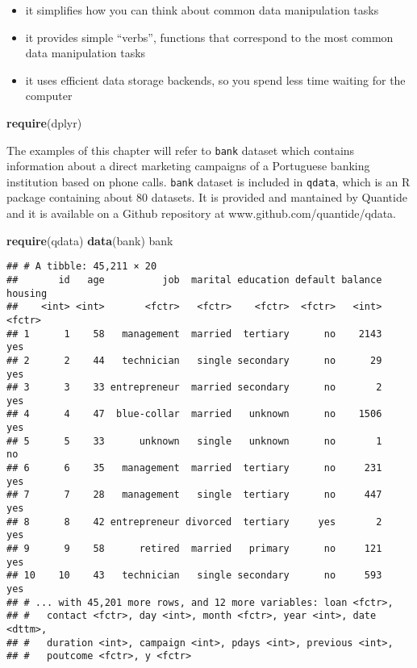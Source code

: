 \documentclass[]{book}
\newenvironment{Shaded}{\begin{snugshade}}{\end{snugshade}}
\newcommand{\KeywordTok}[1]{\textcolor[rgb]{0.13,0.29,0.53}{\textbf{{#1}}}}
\newcommand{\NormalTok}[1]{{#1}}
\providecommand{\tightlist}{%
  \setlength{\itemsep}{0pt}\setlength{\parskip}{0pt}}
\def\tightlist{}
\begin{document}
\begin{itemize}
\tightlist
\item
  it simplifies how you can think about common data manipulation tasks
\item
  it provides simple ``verbs'', functions that correspond to the most
  common data manipulation tasks
\item
  it uses efficient data storage backends, so you spend less time
  waiting for the computer
\end{itemize}

\begin{Shaded}
\begin{Highlighting}[]
\KeywordTok{require}\NormalTok{(dplyr)}
\end{Highlighting}
\end{Shaded}

The examples of this chapter will refer to \texttt{bank} dataset which
contains information about a direct marketing campaigns of a Portuguese
banking institution based on phone calls. \texttt{bank} dataset is
included in \texttt{qdata}, which is an R package containing about 80
datasets. It is provided and mantained by Quantide and it is available
on a Github repository at www.github.com/quantide/qdata.

\begin{Shaded}
\begin{Highlighting}[]
\KeywordTok{require}\NormalTok{(qdata)}
\KeywordTok{data}\NormalTok{(bank) }
\NormalTok{bank}
\end{Highlighting}
\end{Shaded}

\begin{verbatim}
## # A tibble: 45,211 × 20
##       id   age          job  marital education default balance housing
##    <int> <int>       <fctr>   <fctr>    <fctr>  <fctr>   <int>  <fctr>
## 1      1    58   management  married  tertiary      no    2143     yes
## 2      2    44   technician   single secondary      no      29     yes
## 3      3    33 entrepreneur  married secondary      no       2     yes
## 4      4    47  blue-collar  married   unknown      no    1506     yes
## 5      5    33      unknown   single   unknown      no       1      no
## 6      6    35   management  married  tertiary      no     231     yes
## 7      7    28   management   single  tertiary      no     447     yes
## 8      8    42 entrepreneur divorced  tertiary     yes       2     yes
## 9      9    58      retired  married   primary      no     121     yes
## 10    10    43   technician   single secondary      no     593     yes
## # ... with 45,201 more rows, and 12 more variables: loan <fctr>,
## #   contact <fctr>, day <int>, month <fctr>, year <int>, date <dttm>,
## #   duration <int>, campaign <int>, pdays <int>, previous <int>,
## #   poutcome <fctr>, y <fctr>
\end{verbatim}
\end{document}
